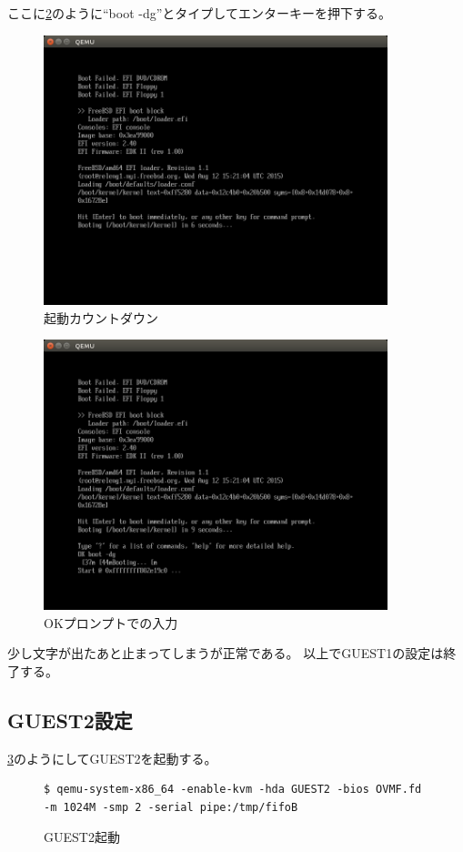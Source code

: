 \documentclass[a4j]{jarticle}
\begin{document}
ここに\ref{fig:FreeBSD_OK}のように``boot -dg''とタイプしてエンターキーを押下する。
\begin{figure}[htbp]
	\begin{center}
    	\includegraphics[width=10cm]{./IMG/FreeBSD_CNTDN.png}
	\end{center}
    \caption{起動カウントダウン}
    \label{fig:FreeBSD_CNTDN}
\end{figure}
\begin{figure}[htbp]
	\begin{center}
    	\includegraphics[width=10cm]{./IMG/FreeBSD_OK.png}
	\end{center}
    \caption{OKプロンプトでの入力}
    \label{fig:FreeBSD_OK}
\end{figure}
少し文字が出たあと止まってしまうが正常である。
以上でGUEST1の設定は終了する。

\subsection{GUEST2設定}
\ref{fig:FreeBSD_guest2}のようにしてGUEST2を起動する。
\begin{figure}[htbp]
	\begin{center}
		\begin{lstlisting}[basicstyle=\ttfamily\footnotesize, frame=single, breaklines=true]
$ qemu-system-x86_64 -enable-kvm -hda GUEST2 -bios OVMF.fd -m 1024M -smp 2 -serial pipe:/tmp/fifoB
		\end{lstlisting}
	\end{center}
	\caption{GUEST2起動}
	\label{fig:FreeBSD_guest2}
\end{figure}
\end{document}
